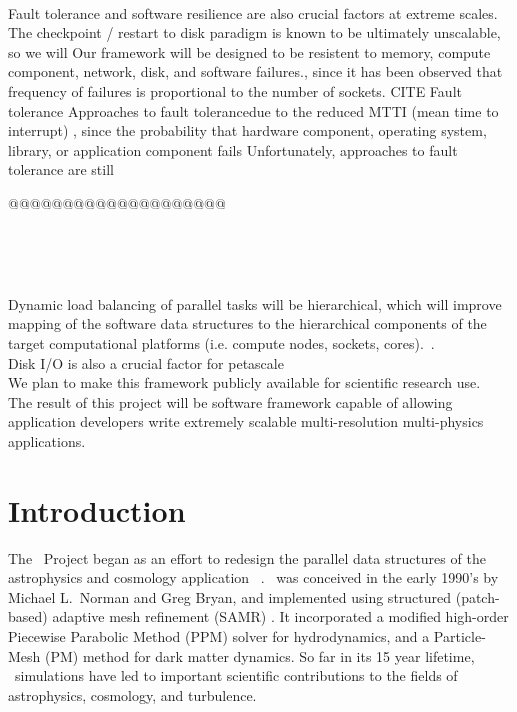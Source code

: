 \documentclass[14pt,letter]{article}
\begin{document}
\ \\  Fault tolerance and software
resilience are also crucial factors at extreme scales.  The
checkpoint / restart to disk paradigm is known to be ultimately unscalable, so we will Our framework
will be designed to be resistent to memory, compute component, network,
disk, and software failures., since it has been
observed that frequency of failures is proportional to the number of
sockets. CITE Fault tolerance Approaches to fault tolerancedue to the
reduced MTTI (mean time to interrupt) , since the probability that
hardware component, operating system, library, or application
component fails Unfortunately, approaches to fault tolerance are still

@@@@@@@@@@@@@@@@@@@@

\ \\ 


\ \\ 
%

%
Dynamic load balancing of parallel tasks will be hierarchical, which
will improve mapping of the software data structures to the
hierarchical components of the target computational platforms (i.e.
compute nodes, sockets, cores).~\cite{@@@LAN-DLB}.
%
%
%
\ \\ 
Disk I/O is also a crucial factor for petascale 
%
\ \\  We plan to make this framework publicly
available for scientific research use.
%
\ \\  
The result of this project will be software framework capable of
allowing application developers write extremely scalable
multi-resolution multi-physics applications.

\section{Introduction} \label{s:intro}


The \cello\ Project began as an effort to redesign the parallel data
structures of the astrophysics and cosmology application \enzo\
\cite{@@@ENZO}.  \enzo\ was conceived in the early 1990's by Michael
L.~Norman and Greg Bryan, and implemented using structured
(patch-based) adaptive mesh refinement (SAMR) \cite{@@@SAMR}.  It
incorporated a modified high-order Piecewise Parabolic Method (PPM)
solver \cite{@@@PPM} for hydrodynamics, and a Particle-Mesh (PM)
method \cite{@@@PM} for dark matter dynamics.  So far in its 15 year
lifetime, \enzo\ simulations have led to important scientific
contributions to the fields of astrophysics, cosmology, and
turbulence.
\end{document}
